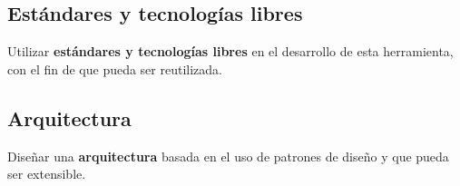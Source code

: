 \subsection{Estándares y tecnologías libres}
Utilizar \textbf{estándares y tecnologías libres} en el desarrollo de esta herramienta, con el fin de que pueda ser reutilizada.
\subsection{Arquitectura}
Diseñar una \textbf{arquitectura} basada en el uso de patrones de diseño y que pueda ser extensible.



